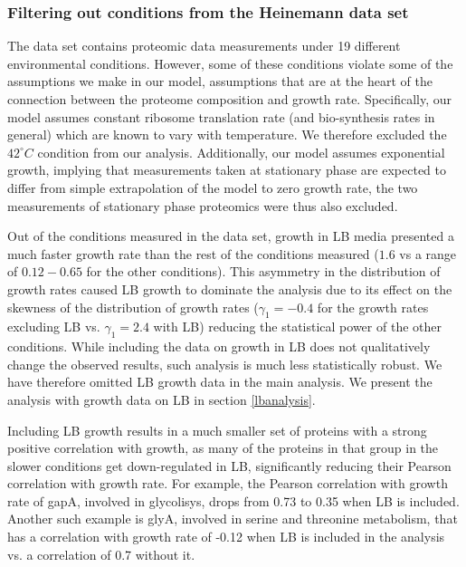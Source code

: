 \documentclass[a4paper]{article}
\begin{document}
\subsubsection{Filtering out conditions from the Heinemann data set}
\label{heinemanncond} 

The \cite{Heinemann2015} data set contains proteomic data measurements under 19 different environmental conditions.
However, some of these conditions violate some of the assumptions we make in our model, assumptions that are at the heart of the connection between the proteome composition and growth rate.
Specifically, our model assumes constant ribosome translation rate (and bio-synthesis rates in general) which are known to vary with temperature.
We therefore excluded the $42^\circ C$ condition from our analysis.
Additionally, our model assumes exponential growth, implying that measurements taken at stationary phase are expected to differ from simple extrapolation of the model to zero growth rate, the two measurements of stationary phase proteomics were thus also excluded.

Out of the conditions measured in the \cite{Heinemann2015} data set, growth in LB media presented a much faster growth rate than the rest of the conditions measured ($1.6$ vs a range of $0.12-0.65$ for the other conditions).
This asymmetry in the distribution of growth rates caused LB growth to dominate the analysis due to its effect on the skewness of the distribution of growth rates ($\gamma_1=-0.4$ for the growth rates excluding LB vs. $\gamma_1=2.4$ with LB) reducing the statistical power of the other conditions.
While including the data on growth in LB does not qualitatively change the observed results, such analysis is much less statistically robust.
We have therefore omitted LB growth data in the main analysis.
We present the analysis with growth data on LB in section \ref{lbanalysis}.

Including LB growth results in a much smaller set of proteins with a strong positive correlation with growth, as many of the proteins in that group in the slower conditions get down-regulated in LB, significantly reducing their Pearson correlation with growth rate.
For example, the Pearson correlation with growth rate of gapA, involved in glycolisys, drops from 0.73 to 0.35 when LB is included.
Another such example is glyA, involved in serine and threonine metabolism, that has a correlation with
growth rate of -0.12 when LB is included in the analysis vs. a correlation of 0.7 without it.
\end{document}
